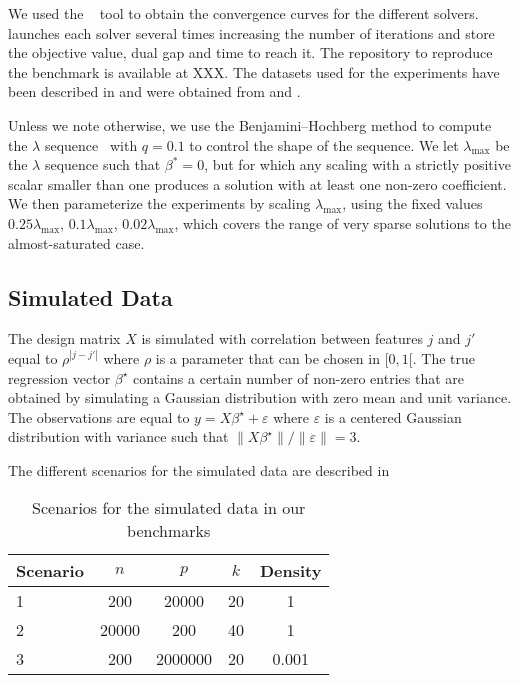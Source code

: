We used the ~\parencite{moreau2022benchopt} tool to obtain the convergence curves for the different solvers.
 launches each solver several times increasing the number of iterations and store the objective value, dual gap and time to reach it.
The repository to reproduce the benchmark is available at XXX.
The datasets used for the experiments have been described in  and were obtained from \textcite{chang2011,chang2016} and \textcite{breheny2022}.

Unless we note otherwise, we use the Benjamini--Hochberg method to compute the \(\lambda\) sequence~\parencite{bogdan2015} with \(q=0.1\) to control the shape of the sequence.
We let \(\lambda_\text{max}\) be the \(\lambda\) sequence such that \(\beta^* = 0\), but for which any scaling with a strictly positive scalar smaller than one produces a solution with at least one non-zero coefficient.
We then parameterize the experiments by scaling \(\lambda_\text{max}\), using the fixed values \(0.25 \lambda_\text{max}\), \(0.1 \lambda_\text{max}\), \(0.02 \lambda_\text{max}\), which covers the range of very sparse solutions to the almost-saturated case.

\subsection{Simulated Data}

The design matrix $X$ is simulated with correlation between features $j$ and $j'$ equal to $\rho^{|j-j'|}$ where $\rho$ is a parameter that can be chosen in $[0, 1[$.
The true regression vector $\beta^\star$ contains a certain number of non-zero entries that are obtained by simulating a Gaussian distribution with zero mean and unit variance.
The observations are equal to $y=X\beta^\star + \varepsilon$ where $\varepsilon$ is a centered Gaussian distribution with variance such that $\lVert X\beta^\star\rVert / \lVert \varepsilon \rVert = 3$.

The different scenarios for the simulated data are described in 

\begin{table}[hbt]
  \centering
  \caption{Scenarios for the simulated data in our benchmarks}
  \label{tab:simulated-data}
  \begin{tabular}{
      l
      S[table-format=5.0,round-mode=off]
      S[table-format=7.0,round-mode=off]
      S[table-format=2.0,round-mode=off]
      S[table-format=1.3,round-mode=off]
    }
    \toprule
    {Scenario} & \(n\) & \(p\)   & \(k\) & {Density} \\           & 200   & 20000   & 20    & 1         \\
    2          & 20000 & 200     & 40    & 1         \\
    3          & 200   & 2000000 & 20    & 0.001     \\ \bottomrule
  \end{tabular}
\end{table}

